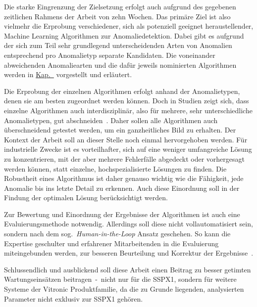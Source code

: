 Die starke Eingrenzung der Zielsetzung erfolgt auch aufgrund des gegebenen zeitlichen Rahmens der Arbeit von zehn Wochen. Das primäre
Ziel ist also vielmehr die Erprobung verschiedener, sich als potenziell geeignet heraustellender, Machine Learning Algorithmen zur
Anomaliedetektion. Dabei gibt es aufgrund der sich zum Teil sehr grundlegend unterscheidenden Arten von Anomalien entsprechend pro
Anomalietyp separate Kandidaten. Die voneinander abweichenden Anomaliearten und die dafür jeweils nominierten Algorithmen werden in
\hyperref[ch:anomaliedetektion]{Kap.~} vorgestellt und erläutert.

Die Erprobung der einzelnen Algorithmen erfolgt anhand der Anomalietypen, denen sie am besten zugeordnet werden können. Doch in
Studien zeigt sich, dass einzelne Algorithmen auch interdisziplinär, also für mehrere, sehr unterschiedliche Anomalietypen, gut
abschneiden~\cite[S.~30~-~31]{Wenig2024}\cite{Schmidl2022}. Daher sollen alle Algorithmen auch überschneidend getestet werden, um ein ganzheitliches Bild zu erhalten.
Der Kontext der Arbeit soll an dieser Stelle noch einmal hervorgehoben werden. Für industrielle Zwecke ist es vorteilhafter, sich auf eine
weniger umfangreiche Lösung zu konzentrieren, mit der aber mehrere Fehlerfälle abgedeckt oder vorhergesagt werden können, statt einzelne,
hochspezialisierte Lösungen zu finden. Die Robustheit eines Algorithmus ist daher genauso wichtig wie die Fähigkeit, jede Anomalie bis
ins letzte Detail zu erkennen. Auch diese Einordnung soll in der Findung der optimalen Lösung berücksichtigt werden.

Zur Bewertung und Einordnung der Ergebnisse der Algorithmen ist auch eine Evaluierungsmethode notwendig. Allerdings soll diese nicht
vollautomatisiert sein, sondern nach dem sog.~\textit{Human-in-the-Loop} Ansatz geschehen. So kann die Expertise geschulter und
erfahrener Mitarbeitenden in die Evaluierung miteingebunden werden, zur besseren Beurteilung und Korrektur der Ergebnisse~\cite{Deng2024}.

Schlussendlich und ausblickend soll diese Arbeit einen Beitrag zu besser getimten Wartungseinsätzen beitragen~-~nicht nur für die SSPX1,
sondern für weitere Systeme der Vitronic Produktfamilie, da die zu Grunde liegenden, analysierten Parameter nicht exklusiv zur SSPX1 gehören.